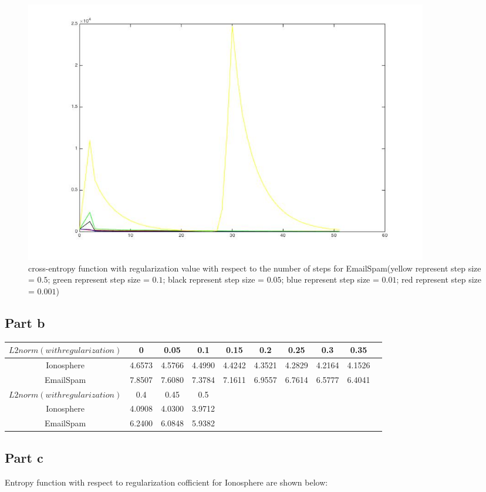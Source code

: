 \documentclass[11pt]{article}
\numberwithin{equation}{section}
\begin{document}
	
	\begin{figure} [H]
    	\centering 
    	\includegraphics[width=7in]{4(a)_2} 
    	\caption{cross-entropy function with regularization value with respect to the number of steps for EmailSpam(yellow represent step size = $0.5$; green represent step size = $0.1$; black represent step size = $0.05$; blue represent step size = $0.01$; red represent step size = $0.001$)} 
    	\label{fig:side:a} 
	\end{figure}
	
	\subsection{Part b}
	
	\begin{tabular}{|c|c|c|c|c|c|c|c|c|c|}
	\hline
	$L2 norm (with regularization)$& 0& 0.05& 0.1& 0.15& 0.2& 0.25& 0.3& 0.35\\
	\hline
	Ionosphere& 4.6573& 4.5766& 4.4990& 4.4242& 4.3521& 4.2829& 4.2164& 4.1526\\
	\hline	
	EmailSpam& 7.8507& 7.6080& 7.3784& 7.1611& 6.9557& 6.7614& 6.5777& 6.4041\\	
	\hline
	$L2 norm (with regularization)$& 0.4& 0.45& 0.5\\
	\hline
	Ionosphere& 4.0908& 4.0300& 3.9712\\
	\hline
	EmailSpam& 6.2400& 6.0848& 5.9382\\
	\hline
	\end{tabular}
	
	\subsection{Part c}
	Entropy function with respect to regularization  cofficient for Ionosphere are shown below:
\end{document}
